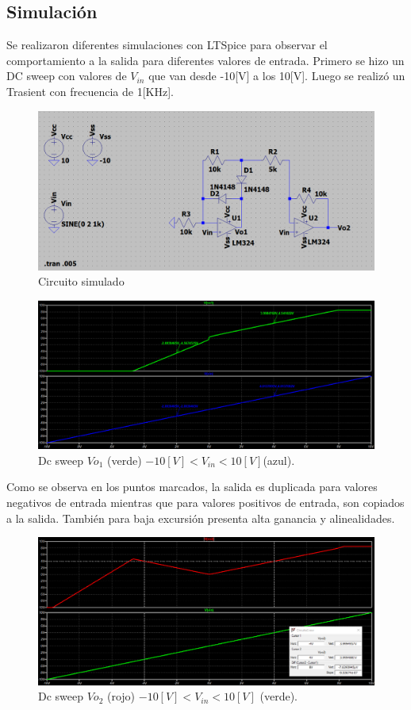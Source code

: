 \subsection{Simulación}
Se realizaron diferentes simulaciones con LTSpice para observar el comportamiento a la salida para diferentes valores de entrada. Primero se hizo un DC sweep con valores de $V_{in}$ que van desde -10[V] a los 10[V]. Luego se realizó un Trasient con frecuencia de 1[KHz].
\begin{figure}[H]
	\centering
	\includegraphics[width=1\textwidth]{figuras/Circuito3.png}
	\caption{Circuito simulado}
\end{figure}
\begin{figure}[H]
	\centering
	\includegraphics[width=1\textwidth]{figuras/dc_sweep_vo1.png}
	\caption{Dc sweep $Vo_1$ (verde) $ -10[V] < V_{in} < 10 [V]$(azul).}
\end{figure}
Como se observa en los puntos marcados, la salida es duplicada para valores negativos de entrada mientras que para valores positivos de entrada, son copiados a la salida.
También para baja excursión presenta alta ganancia y alinealidades.
\begin{figure}[H]
	\centering
	\includegraphics[width=1\textwidth]{figuras/dc_sweep_vo2.png}
	\caption{Dc sweep $Vo_2$ (rojo) $ -10[V] < V_{in} < 10 [V]$ (verde).}
\end{figure}
